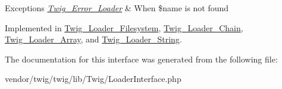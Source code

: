 \begin{DoxyExceptions}{Exceptions}
{\em \hyperlink{classTwig__Error__Loader}{Twig\+\_\+\+Error\+\_\+\+Loader}} & When \$name is not found \\
\hline
\end{DoxyExceptions}


Implemented in \hyperlink{classTwig__Loader__Filesystem_a711f91783346edac8b4c645804c8ecfe}{Twig\+\_\+\+Loader\+\_\+\+Filesystem}, \hyperlink{classTwig__Loader__Chain_aacfd7c71e311f67fce90aadaed239c24}{Twig\+\_\+\+Loader\+\_\+\+Chain}, \hyperlink{classTwig__Loader__Array_a043e7a37258cc0c7a862de0aabeff01b}{Twig\+\_\+\+Loader\+\_\+\+Array}, and \hyperlink{classTwig__Loader__String_ab77f72cf673352c333a8aaf9df3714f2}{Twig\+\_\+\+Loader\+\_\+\+String}.



The documentation for this interface was generated from the following file\+:\begin{DoxyCompactItemize}
\item 
vendor/twig/twig/lib/\+Twig/Loader\+Interface.\+php\end{DoxyCompactItemize}
